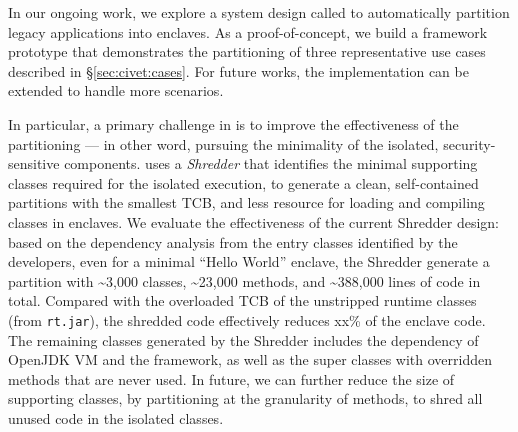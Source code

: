 In our ongoing work,
we explore a system design called \term{\civet{}} to automatically partition legacy \java{} applications into \sgx{} enclaves.
As a proof-of-concept,
we build a framework prototype that demonstrates the partitioning of
three representative use cases described in \S\ref{sec:civet:cases}.
For future works,
the implementation can be extended to handle more scenarios.


In particular, a primary challenge in \civet{} is
to improve the effectiveness of the partitioning
--- in other word, pursuing the minimality of the isolated, security-sensitive components.
\civet{} uses a \emph{Shredder} that identifies the minimal supporting classes required
for the isolated execution,
to generate a clean, self-contained partitions
with the smallest TCB, and less resource for loading and compiling classes in enclaves.
We evaluate the effectiveness of the current Shredder design:
based on the dependency analysis from the entry classes identified by the developers,
even for a minimal ``Hello World'' enclave,
the Shredder generate a partition with
\~{}3,000 classes, \~{}23,000 methods,
and \~{}388,000 lines of code in total.%
Compared with the overloaded TCB of the unstripped \java{} runtime classes
(from {\tt rt.jar}),
the shredded code effectively reduces xx\% of the enclave code.
The remaining classes generated by the Shredder
includes the dependency of OpenJDK \java{} VM and the \civet{} framework,
as well as the super classes
with overridden methods that are never used.
In future, we can further reduce the size of supporting classes,
by partitioning 
at the granularity of methods,
to shred all unused code in the isolated classes.


